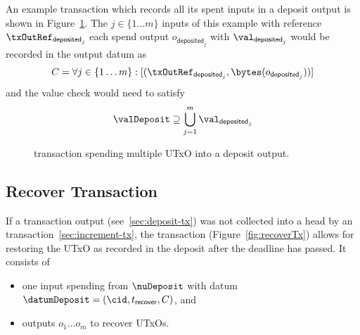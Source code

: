 \noindent An example transaction which records all its spent inputs in a deposit output is
shown in Figure~\ref{fig:depositTx}. The $j \in \{1 \dots m\}$ inputs of this example with reference $\txOutRef_{\mathsf{deposited}_{j}}$ each spend output $o_{\mathsf{deposited}_{j}}$ with $\val_{\mathsf{deposited}_{j}}$ would be recorded in the output datum as
\[
	C = \forall j \in \{1 \dots m\} : [(\txOutRef_{\mathsf{deposited}_{j}},\bytes(o_{\mathsf{deposited}_{j}}))]
\]
\noindent and the value check would need to satisfy
\[
	\valDeposit \supseteq \bigcup_{j=1}^{m} \val_{\mathsf{deposited}_{j}}
\]
\begin{figure}[H]
	\centering
	
	\caption{\mtxDeposit{} transaction spending multiple UTxO into a deposit
		output.}\label{fig:depositTx}
\end{figure}

\subsection{Recover Transaction}\label{sec:recover-tx}

\noindent If a \mtxDeposit{} transaction output (see~\ref{sec:deposit-tx}) was
not collected into a head by an \mtxIncrement{}
transaction~\ref{sec:increment-tx}, the \mtxRecover{} transaction
(Figure~\ref{fig:recoverTx}) allows for restoring the UTxO as recorded in the
deposit after the deadline has passed. It consists of
\begin{itemize}
	\item one input spending from $\nuDeposit$ with datum $\datumDeposit = (\cid, t_{\mathsf{recover}}, C)$, and
	\item outputs $o_{1} \dots o_{m}$ to recover UTxOs.
\end{itemize}

